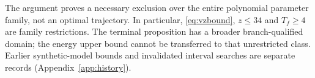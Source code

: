 The argument proves a necessary exclusion over the entire polynomial parameter family, not an optimal trajectory. In particular, \eqref{eq:vzbound}, $z\leq34$ and $T_f\geq4$ are family restrictions. The terminal proposition has a broader branch-qualified domain; the energy upper bound cannot be transferred to that unrestricted class. Earlier synthetic-model bounds and invalidated interval searches are separate records (Appendix~\ref{app:history}).
